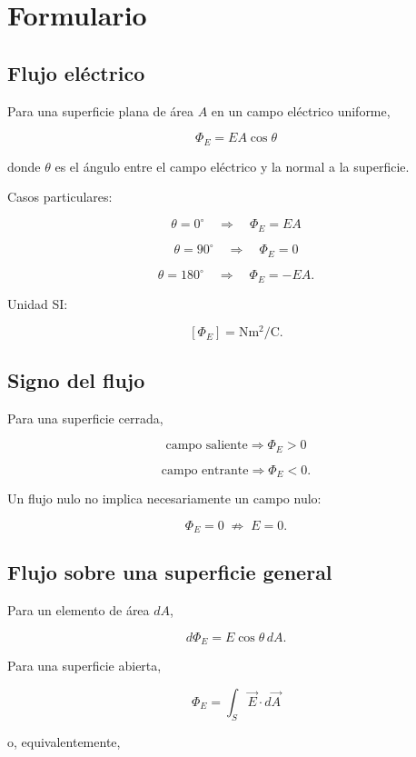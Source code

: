\section{Formulario}

\subsection{Flujo eléctrico}

Para una superficie plana de área \(A\) en un campo eléctrico uniforme,

\[
\boxed{\Phi_E=EA\cos\theta}
\]

donde \(\theta\) es el ángulo entre el campo eléctrico y la normal a la superficie.

Casos particulares:

\[
\theta=0^\circ
\quad\Longrightarrow\quad
\boxed{\Phi_E=EA}
\]

\[
\theta=90^\circ
\quad\Longrightarrow\quad
\boxed{\Phi_E=0}
\]

\[
\theta=180^\circ
\quad\Longrightarrow\quad
\boxed{\Phi_E=-EA}.
\]

Unidad SI:

\[
\boxed{
[\Phi_E]=\si{\newton\metre\squared\per\coulomb}
}.
\]


\subsection{Signo del flujo}

Para una superficie cerrada,

\[
\boxed{\text{campo saliente}\Longrightarrow\Phi_E>0}
\]

\[
\boxed{\text{campo entrante}\Longrightarrow\Phi_E<0}.
\]

Un flujo nulo no implica necesariamente un campo nulo:

\[
\boxed{\Phi_E=0\;\not\Rightarrow\;E=0}.
\]


\subsection{Flujo sobre una superficie general}

Para un elemento de área \(dA\),

\[
\boxed{d\Phi_E=E\cos\theta\,dA}.
\]

Para una superficie abierta,

\[
\boxed{
\Phi_E=\int_S\vec E\cdot d\vec A
}
\]

o, equivalentemente,

